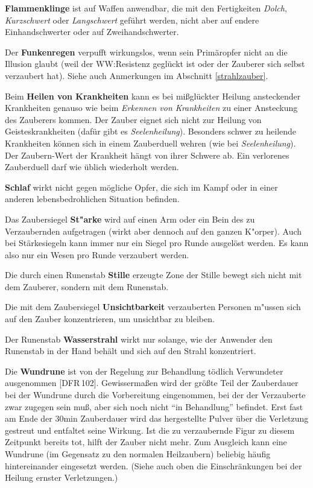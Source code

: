 \documentclass[10pt,a4paper,germanpar]{article}
\begin{document}
\textbf{Flammenklinge} ist auf Waffen anwendbar, die mit den
Fertigkeiten \emph{Dolch}, \emph{Kurzschwert} oder \emph{Langschwert}
geführt werden, nicht aber auf endere Einhandschwerter oder auf
Zweihandschwerter.

Der \textbf{Funkenregen} verpufft wirkungslos, wenn sein Primäropfer
nicht an die Illusion glaubt (weil der WW:Resistenz geglückt ist oder
der Zauberer sich selbst verzaubert hat). Siehe auch Anmerkungen im
Abschnitt \ref{strahlzauber}.

Beim \textbf{Heilen von Krankheiten} kann es bei mißglückter Heilung
ansteckender Krankheiten genauso wie beim \emph{Erkennen von
  Krankheiten} zu einer Ansteckung des Zauberers kommen. Der Zauber
eignet sich nicht zur Heilung von Geisteskrankheiten (dafür gibt es
\emph{Seelenheilung}). Besonders schwer zu heilende Krankheiten können
sich in einem Zauberduell wehren (wie bei \emph{Seelenheilung}). Der
Zaubern-Wert der Krankheit hängt von ihrer Schwere ab. Ein verlorenes
Zauberduell darf wie üblich wiederholt werden.

\textbf{Schlaf} wirkt nicht gegen mögliche Opfer, die sich im Kampf
oder in einer anderen lebensbedrohlichen Situation befinden.

Das Zaubersiegel \textbf{St"arke} wird auf einen Arm oder ein Bein des 
zu Verzaubernden aufgetragen (wirkt aber dennoch auf den ganzen
K"orper). Auch bei Stärkesiegeln kann immer nur ein Siegel pro Runde ausgelöst
werden. Es kann also nur ein Wesen pro Runde verzaubert werden.

Die durch einen Runenstab \textbf{Stille} erzeugte Zone der Stille
bewegt sich nicht mit dem Zauberer, sondern mit dem Runenstab.

%

Die mit dem Zaubersiegel \textbf{Unsichtbarkeit} verzauberten Personen 
m"ussen sich auf den Zauber konzentrieren, um unsichtbar zu bleiben.

Der Runenstab \textbf{Wasserstrahl} wirkt nur solange, wie der
Anwender den Runenstab in der Hand behält und sich auf den Strahl
konzentriert.

Die \textbf{Wundrune} ist von der Regelung zur Behandlung tödlich
Verwundeter ausgenommen [DFR\,102]. Gewissermaßen wird der größte Teil
der Zauberdauer bei der Wundrune durch die Vorbereitung eingenommen,
bei der der Verzauberte zwar zugegen sein muß, aber sich noch nicht
"`in Behandlung"' befindet. Erst fast am Ende der 30min Zauberdauer
wird das hergestellte Pulver über die Verletzung gestreut und
entfaltet seine Wirkung. Ist die zu verzaubernde Figur zu diesem
Zeitpunkt bereits tot, hilft der Zauber nicht mehr. Zum Ausgleich kann
eine Wundrune (im Gegensatz zu den normalen Heilzaubern) beliebig
häufig hintereinander eingesetzt werden. (Siehe auch oben die
Einschränkungen bei der Heilung ernster Verletzungen.)
\end{document}
